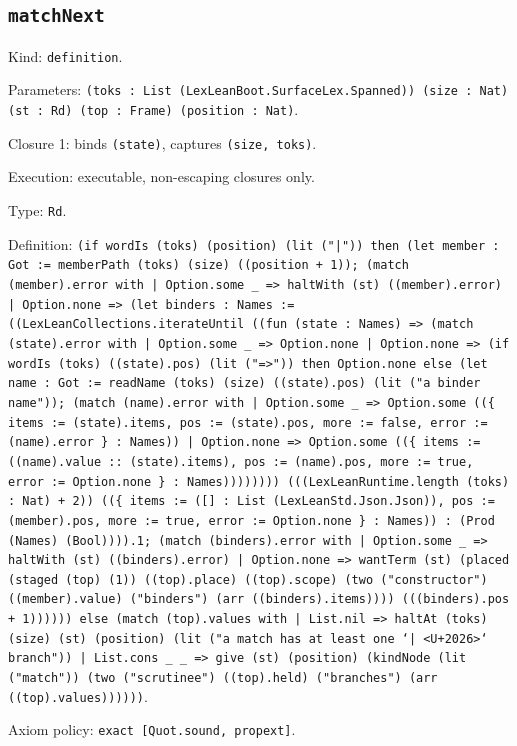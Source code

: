 \documentclass[11pt]{article}
\begin{document}
\subsection*{\texttt{matchNext}}
\noindent Kind: \texttt{definition}.\par
\noindent Parameters: \texttt{(toks : List (LexLeanBoot.SurfaceLex.Spanned)) (size : Nat) (st : Rd) (top : Frame) (position : Nat)}.\par
\noindent Closure 1: binds \texttt{(state)}, captures \texttt{(size, toks)}.\par
\noindent Execution: executable, non-escaping closures only.\par
\noindent Type: \texttt{Rd}.\par
\noindent Definition: \texttt{(if wordIs (toks) (position) (lit ("|")) then (let member : Got := memberPath (toks) (size) ((position + 1)); (match (member).error with | Option.some \_ => haltWith (st) ((member).error) | Option.none => (let binders : Names := ((LexLeanCollections.iterateUntil ((fun (state : Names) => (match (state).error with | Option.some \_ => Option.none | Option.none => (if wordIs (toks) ((state).pos) (lit ("=>")) then Option.none else (let name : Got := readName (toks) (size) ((state).pos) (lit ("a binder name")); (match (name).error with | Option.some \_ => Option.some ((\{ items := (state).items, pos := (state).pos, more := false, error := (name).error \} : Names)) | Option.none => Option.some ((\{ items := ((name).value :: (state).items), pos := (name).pos, more := true, error := Option.none \} : Names)))))))) (((LexLeanRuntime.length (toks) : Nat) + 2)) ((\{ items := ([] : List (LexLeanStd.Json.Json)), pos := (member).pos, more := true, error := Option.none \} : Names)) : (Prod (Names) (Bool)))).1; (match (binders).error with | Option.some \_ => haltWith (st) ((binders).error) | Option.none => wantTerm (st) (placed (staged (top) (1)) ((top).place) ((top).scope) (two ("constructor") ((member).value) ("binders") (arr ((binders).items)))) (((binders).pos + 1)))))) else (match (top).values with | List.nil => haltAt (toks) (size) (st) (position) (lit ("a match has at least one `| <U+2026>` branch")) | List.cons \_ \_ => give (st) (position) (kindNode (lit ("match")) (two ("scrutinee") ((top).held) ("branches") (arr ((top).values))))))}.\par
\noindent Axiom policy: \texttt{exact [Quot.sound, propext]}.\par
\end{document}
